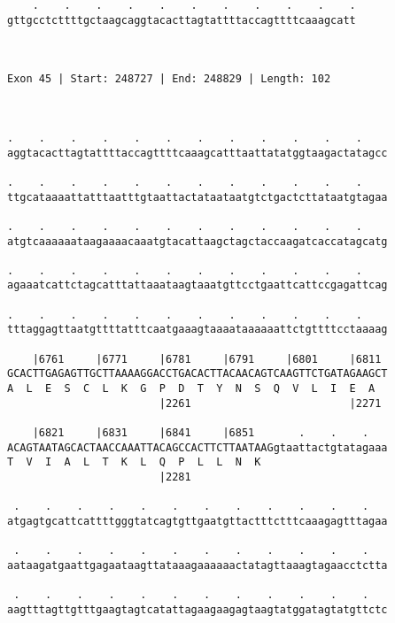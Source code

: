 \documentclass{article}
\begin{document}
\begin{Verbatim}
    .    .    .    .    .    .    .    .    .    .    .
gttgcctcttttgctaagcaggtacacttagtattttaccagttttcaaagcatt
                                                       
                                                       
 
Exon 45 | Start: 248727 | End: 248829 | Length: 102



.    .    .    .    .    .    .    .    .    .    .    .    
aggtacacttagtattttaccagttttcaaagcatttaattatatggtaagactatagcc
                                                            
.    .    .    .    .    .    .    .    .    .    .    .    
ttgcataaaattatttaatttgtaattactataataatgtctgactcttataatgtagaa
                                                            
.    .    .    .    .    .    .    .    .    .    .    .    
atgtcaaaaaataagaaaacaaatgtacattaagctagctaccaagatcaccatagcatg
                                                            
.    .    .    .    .    .    .    .    .    .    .    .    
agaaatcattctagcatttattaaataagtaaatgttcctgaattcattccgagattcag
                                                            
.    .    .    .    .    .    .    .    .    .    .    .    
tttaggagttaatgttttatttcaatgaaagtaaaataaaaaattctgttttcctaaaag
                                                            
    |6761     |6771     |6781     |6791     |6801     |6811 
GCACTTGAGAGTTGCTTAAAAGGACCTGACACTTACAACAGTCAAGTTCTGATAGAAGCT
A  L  E  S  C  L  K  G  P  D  T  Y  N  S  Q  V  L  I  E  A  
                        |2261                         |2271 
  
    |6821     |6831     |6841     |6851       .    .    .   
ACAGTAATAGCACTAACCAAATTACAGCCACTTCTTAATAAGgtaattactgtatagaaa
T  V  I  A  L  T  K  L  Q  P  L  L  N  K                    
                        |2281                               
  
 .    .    .    .    .    .    .    .    .    .    .    .   
atgagtgcattcattttgggtatcagtgttgaatgttactttctttcaaagagtttagaa
                                                            
 .    .    .    .    .    .    .    .    .    .    .    .   
aataagatgaattgagaataagttataaagaaaaaactatagttaaagtagaacctctta
                                                            
 .    .    .    .    .    .    .    .    .    .    .    .   
aagtttagttgtttgaagtagtcatattagaagaagagtaagtatggatagtatgttctc
                                                            

\end{Verbatim}
\end{document}

